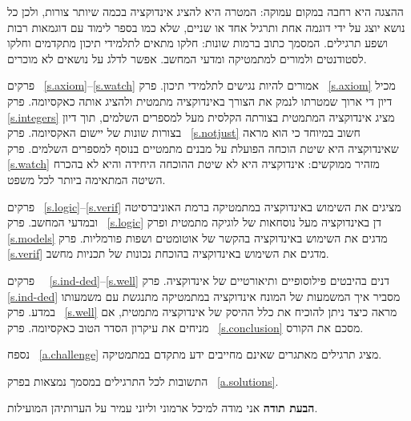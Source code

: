 ההצגה היא רחבה במקום עמוקה: המטרה היא להציג אינדוקציה בכמה שיותר צורות, ולכן כל נושא יוצג על ידי דוגמה אחת ותרגיל אחד או שניים, שלא כמו בספר לימוד עם דוגמאות רבות ושפע תרגילים. המסמך כתוב ברמות שונות: חלקו מתאים לתלמידי תיכון מתקדמים וחלקו לסטודנטים ולמורים למתמטיקה ומדעי המחשב. אפשר לדלג על נושאים לא מוכרים.

פרקים~%
\ref{s.axiom}--\ref{s.watch}
אמורים להיות נגישים לתלמידי תיכון. פרק~%
\ref{s.axiom}
מכיל דיון די ארוך שמטרתו לנמק את הצורך באינדוקציה מתמטית ולהציג אותה כאקסיומה. פרק~%
\ref{s.integers}
מציג אינדוקציה המתמטית בצורתה הקלסית מעל למספרים השלמים, תוך דיון בצורות שונות של יישום האקסיומה. פרק~%
\ref{s.notjust}
חשוב במיוחד כי הוא מראה שאינדוקציה היא שיטת הוכחה הפועלת על מבנים מתמטיים בנוסף למספרים השלמים. פרק~%
\ref{s.watch}
מזהיר ממוקשים: אינדוקציה היא לא שיטת ההוכחה היחידה והיא לא בהכרח השיטה המתאימה ביותר לכל משפט.

פרקים~%
\ref{s.logic}--\ref{s.verif}
מציגים את השימוש באינדוקציה במתמטיקה ברמת האוניברסיטה ובמדעי המחשב. פרק~%
\ref{s.logic}
דן באינדוקציה מעל נוסחאות של לוגיקה מתמטית ופרק~%
\ref{s.models}
מדגים את השימוש באינדוקציה בהקשר של אוטומטים ושפות פורמליות. פרק~%
\ref{s.verif}
מדגים את השימוש באינדוקציה בהוכחת נכונות של תכניות מחשב.

פרקים~%
~\ref{s.ind-ded}--\ref{s.well}
דנים בהיבטים פילוסופיים ותיאורטיים של אינדוקציה. פרק~%
\ref{s.ind-ded}
מסביר איך המשמעות של המונח אינדוקציה במתמטיקה מתנגשת עם משמעותו במדע. פרק~%
\ref{s.well}
מראה כיצד ניתן להוכיח את כלל ההיסק של אינדוקציה מתמטית, אם מניחים את עיקרון הסדר הטוב כאקסיומה. פרק~%
\ref{s.conclusion}
מסכם את הקורס.

נספח~%
\ref{a.challenge}
מציג תרגילים מאתגרים שאינם מחייבים ידע מתקדם במתמטיקה.

התשובות לכל התרגילים במסמך נמצאות בפרק~%
\ref{a.solutions}.

\bigskip

\textbf{הבעת תודה}
אני מודה למיכל ארמוני וליוני עמיר על הערותיהן המועילות.

